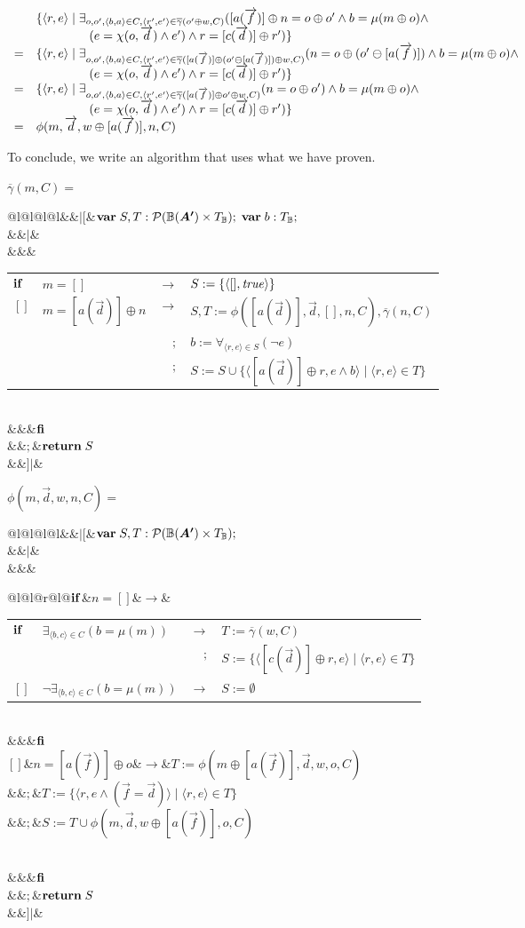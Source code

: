 \documentclass[a4paper,twoside]{article}
\makeatletter
\def\vec#1{\overrightarrow{#1}}		%
\def\mset#1{[#1]}
\def\tup#1{\langle #1\rangle}
\newenvironment{GCL}%
{\begin{trivlist}\item[]\hspace{4mm}}{\end{trivlist}}
\newcommand{\gprogvar}[2]{\begin{tabular}[t]{@{\hspace{0mm}}l@{\hspace{0mm}}l@{\hspace{0mm}}l@{\hspace{2mm}}l}&&$|[$&$#1$\\&&$|$&$#2$\\&&$]|$&\\\end{tabular}}
\newcommand{\gvar}{{\bf var}\;}
\newcommand{\gdecl}[2]{#1: #2;\;}
\newcommand{\gnl}{$\\&&&$}
\newcommand{\gseq}{$\\&&$;$&$}
\newcommand{\gassign}[2]{#1:=#2}
\newcommand{\greturn}[1]{{\bf return}\;#1}
\newcommand{\gif}[2]{$\begin{tabular}[t]{@{\hspace{0mm}}l@{\hspace{2mm}}l@{\hspace{2mm}}r@{\hspace{2mm}}l@{\hspace{0mm}}}${\bf if}$&$#1$&$\rightarrow$&$#2$\\\end{tabular}\\&&&${\bf fi}}
\newcommand{\gifalt}[2]{$\\$[\!]$&$#1$&$\rightarrow$&$#2}
\makeatother
\begin{document}
\begin{center}$\begin{array}{ll}
 & \{\tup{r,e}\;|\;\exists_{o,o',\langle b,a\rangle\in C,\tup{r',e'}\in\overline{\gamma}(o'\oplus w,C)}(\mset{a(\vec{f})}\oplus n=o\oplus o'\land b=\mu(m \oplus o)\land\\&\hspace{15mm}(e=\chi(o,\vec{d})\land e') \land r=\mset{c(\vec{d})}\oplus r')\} \\
= & \{\tup{r,e}\;|\;\exists_{o,o',\langle b,a\rangle\in C,\tup{r',e'}\in\overline{\gamma}(\mset{a(\vec{f})}\oplus (o'\ominus \mset{a(\vec{f})})\oplus w,C)}(n=o\oplus (o'\ominus \mset{a(\vec{f})})\land b=\mu(m \oplus o)\land\\&\hspace{15mm}(e=\chi(o,\vec{d})\land e') \land r=\mset{c(\vec{d})}\oplus r')\} \\
= & \{\tup{r,e}\;|\;\exists_{o,o',\langle b,a\rangle\in C,\tup{r',e'}\in\overline{\gamma}(\mset{a(\vec{f})}\oplus o'\oplus w,C)}(n=o\oplus o')\land b=\mu(m \oplus o)\land\\&\hspace{15mm}(e=\chi(o,\vec{d})\land e') \land r=\mset{c(\vec{d})}\oplus r')\} \\
= & \phi(m,\vec{d},w\oplus \mset{a(\vec{f})},n,C) \\
\end{array}$\end{center}

\noindent To conclude, we write an algorithm that uses what we have proven.

\begin{GCL}
$\overline{\gamma}(m,C)=$
\gprogvar{
  \gvar
  \gdecl{S,T}{\mathcal{P}(\bagmao\times T_{\mathbb{B}})}
  \gvar
  \gdecl{b}{T_{\mathbb{B}}}
}{
  \gnl
  \gif{m=\mset{}}{
    \gassign{S}{\{\tup{\mset{},{\it true}}\}}
  \gifalt{m=\mset{a(\vec{d})}\oplus n}{
    \gassign{S,T}{\phi(\mset{a(\vec{d})},\vec{d},\mset{},n,C),\overline{\gamma}(n,C)}\gseq
    \gassign{b}{\forall_{\tup{r,e}\in S}(\neg e)}\gseq
    \gassign{S}{S\cup\{\tup{\mset{a(\vec{d})}\oplus r,e\land b}\;|\;\tup{r,e}\in T\}}
  }}\gseq
  \greturn{S}
}
\end{GCL}

\begin{GCL}
$\phi(m,\vec{d},w,n,C)=$
\gprogvar{
  \gvar
  \gdecl{S,T}{\mathcal{P}(\bagmao\times T_{\mathbb{B}})}
}{
  \gnl
  \gif{n=\mset{}}{
    \gif{\exists_{\tup{b,c}\in C}(b=\mu(m))}{
      \gassign{T}{\overline{\gamma}(w,C)}\gseq
      \gassign{S}{\{\tup{\mset{c(\vec{d})}\oplus r,e}\;|\;\tup{r,e}\in T\}}
    \gifalt{\neg\exists_{\tup{b,c}\in C}(b=\mu(m))}{
      \gassign{S}{\emptyset}
    }}
  \gifalt{n=\mset{a(\vec{f})}\oplus o}{
    \gassign{T}{\phi(m\oplus\mset{a(\vec{f})},\vec{d},w,o,C)}\gseq
    \gassign{T}{\{\tup{r,e\land(\vec{f}=\vec{d})}\;|\;\tup{r,e}\in T\}}\gseq
    \gassign{S}{T\cup\phi(m,\vec{d},w\oplus\mset{a(\vec{f})},o,C)}
  }}\gseq
  \greturn{S}
}
\end{GCL}
\end{document}
